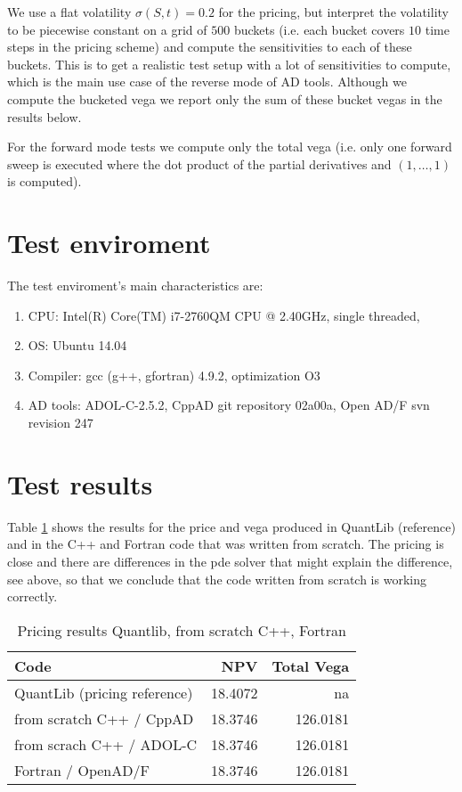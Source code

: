 \documentclass{amsart}
\theoremstyle{plain}
\numberwithin{equation}{section}
\begin{document}
We use a flat volatility $\sigma(S,t) = 0.2$ for the pricing, but interpret the volatility to be piecewise constant on a grid of $500$ buckets (i.e. each bucket covers $10$ time steps in the pricing scheme) and compute the sensitivities to each of these buckets. This is to get a realistic test setup with a lot of sensitivities to compute, which is the main use case of the reverse mode of AD tools. Although we compute the bucketed vega we report only the sum of these bucket vegas in the results below.

For the forward mode tests we compute only the total vega (i.e. only one forward sweep is executed where the dot product of the partial derivatives and $(1,\dots,1)$ is computed).

\section{Test enviroment}

The test enviroment's main characteristics are:

\begin{enumerate}
\item CPU: Intel(R) Core(TM) i7-2760QM CPU @ 2.40GHz, single threaded,
\item OS: Ubuntu 14.04
\item Compiler: gcc (g++, gfortran) 4.9.2, optimization O3
\item AD tools: ADOL-C-2.5.2, CppAD git repository 02a00a, Open AD/F svn revision 247
\end{enumerate}

\section{Test results}

Table \ref{pricing} shows the results for the price and vega produced in QuantLib (reference) and in the C++ and Fortran code that was written from scratch. The pricing is close and there are differences in the pde solver that might explain the difference, see above, so that we conclude that the code written from scratch is working correctly.

\begin{table}[ht]
\caption{Pricing results Quantlib, from scratch C++, Fortran}
\begin{tabular}{l | r | r}
Code & NPV & Total Vega \\ \hline
QuantLib (pricing reference) & 18.4072 & na \\
from scratch C++ / CppAD & 18.3746 & 126.0181 \\
from scrach C++ / ADOL-C & 18.3746 & 126.0181   \\
Fortran / OpenAD/F & 18.3746 & 126.0181 \\
\end{tabular}
\label{pricing}
\end{table}
\end{document}
